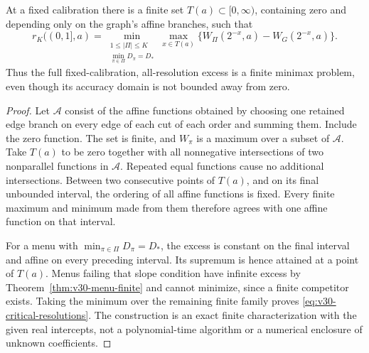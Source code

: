 \begin{proposition}
\label{prop:v30-critical-resolutions}
At a fixed calibration there is a finite set $T(a)\subset[0,\infty)$,
containing zero and depending only on the graph's affine branches,
such that
\begin{equation}\label{eq:v30-critical-resolutions}
 r_K((0,1],a)=
 \min_{\substack{1\le|\Pi|\le K\\\min_{\pi\in\Pi}D_\pi=D_*}}
 \max_{x\in T(a)}
       \{W_\Pi(2^{-x},a)-W_G(2^{-x},a)\}.
\end{equation}
Thus the full fixed-calibration, all-resolution excess is a finite
minimax problem, even though its accuracy domain is not bounded away
from zero.
\end{proposition}
\begin{proof}
Let $\mathcal A$ consist of the affine functions obtained by choosing
one retained edge branch on every edge of each cut of each order and
summing them. Include the zero function. The set is finite, and
$W_\pi$ is a maximum over a subset of $\mathcal A$.
Take $T(a)$ to be zero together with all nonnegative intersections of
two nonparallel functions in $\mathcal A$. Repeated equal functions
cause no additional intersections. Between two consecutive points of
$T(a)$, and on its final unbounded interval, the ordering of all affine
functions is fixed. Every finite maximum and minimum made from them
therefore agrees with one affine function on that interval.

For a menu with $\min_{\pi\in\Pi}D_\pi=D_*$, the excess is constant
on the final interval and affine on every preceding interval. Its
supremum is hence attained at a point of $T(a)$. Menus failing that
slope condition have infinite excess by
Theorem~\ref{thm:v30-menu-finite} and cannot minimize, since a finite
competitor exists. Taking the minimum over the remaining finite family
proves \eqref{eq:v30-critical-resolutions}. The construction is an
exact finite characterization with the given real intercepts, not a
polynomial-time algorithm or a numerical enclosure of unknown
coefficients.
\end{proof}

